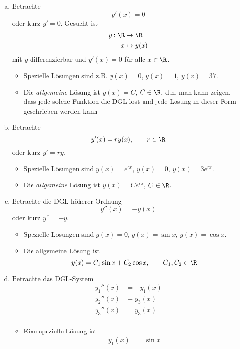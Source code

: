 \documentclass[
]{mycourse}
\begin{document}
\begin{ex} \label{1.1}
	\begin{enumerate}[a)]
		\item
			Betrachte
			\[
				y'(x) = 0
			\]
			oder kurz $y' = 0$.
			Gesucht ist
			\begin{align*}
				y: \R &\to \R \\
				x &\mapsto y(x)
			\end{align*}
			mit $y$ differenzierbar und $y'(x) = 0$ für alle $x \in \R$.
			\begin{itemize}
				\item
					Spezielle Lösungen sind z.B. $y(x)=0$, $y(x)=1$, $y(x) = 37$.
				\item
					Die \emph{allgemeine} Lösung ist $y(x) = C$, $C \in \R$, d.h. man kann zeigen, dass jede solche Funktion die DGL löst und jede Lösung in dieser Form geschrieben werden kann
			\end{itemize}
		\item
			Betrachte
			\[
				y'(x) = r y(x),
				\qquad r\in \R
			\]
			oder kurz $y' = ry$.
			\begin{itemize}
				\item
					Spezielle Lösungen sind $y(x)=e^{rx}$, $y(x)=0$, $y(x)=3e^{rx}$.
				\item
					Die \emph{allgemeine} Lösung ist $y(x) = C e^{rx}$, $C\in \R$.
			\end{itemize}
		\item
			Betrachte die DGL höherer Ordnung
			\[
				y''(x) = -y(x)
			\]
			oder kurz $y'' = -y$.
			\begin{itemize}
				\item
					Spezielle Lösungen sind $y(x) = 0$, $y(x) = \sin x$, $y(x)=\cos x$.
				\item
					Die allgemeine Lösung ist
					\[
						y(x) = C_1 \sin x + C_2 \cos x,
						\qquad C_1, C_2 \in \R
					\]
			\end{itemize}
		\item
			Betrachte das DGL-System
			\begin{align*}
				y_1''(x) &= -y_1(x) \\
				y_2''(x) &= y_3(x) \\
				y_3''(x) &= y_3(x) \\
			\end{align*}
			\begin{itemize}
				\item
					Eine spezielle Lösung ist
					\begin{align*}
						y_1(x) &= \sin x \\

\end{align*}
\end{itemize}
\end{enumerate}
\end{ex}
\end{document}
